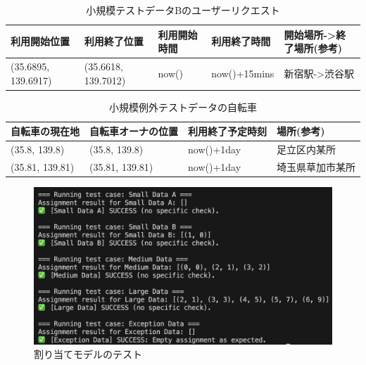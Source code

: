           \begin{table}[t!]
            \caption{小規模テストデータBのユーザーリクエスト}
            \label{tab:小規模テストデータBのユーザーリクエスト}
            \centering
            \begin{tabular}{|l|l|l|l|l|} \hline
              利用開始位置 & 利用終了位置 & 利用開始時間 & 利用終了時間 & 開始場所->終了場所(参考) \\ \hline
              (35.6895, 139.6917) & (35.6618, 139.7012) & now() & now()+15mins & 新宿駅->渋谷駅 \\ \hline
            \end{tabular}
          \end{table}

          \begin{table}[t!]
            \caption{小規模例外テストデータの自転車}
            \label{tab:小規模例外テストデータの自転車}
            \centering
            \begin{tabular}{|l|l|l|l|} \hline
              自転車の現在地 & 自転車オーナの位置 & 利用終了予定時刻 & 場所(参考) \\ \hline
              (35.8, 139.8) & (35.8, 139.8) & now()+1day & 足立区内某所 \\
              (35.81, 139.81) & (35.81, 139.81) & now()+1day & 埼玉県草加市某所 \\ \hline
            \end{tabular}
          \end{table}

          \begin{figure}[b]
            \centering
            \includegraphics[scale=0.29]
            {figures/TestResult.png}
            \caption{割り当てモデルのテスト}
            \label{fig:割り当てモデルのテスト}
          \end{figure}

